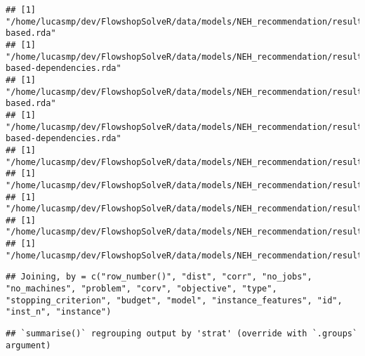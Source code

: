 \documentclass[
]{article}
\newenvironment{Shaded}{\begin{snugshade}}{\end{snugshade}}
\newcommand{\DataTypeTok}[1]{\textcolor[rgb]{0.13,0.29,0.53}{#1}}
\newcommand{\FloatTok}[1]{\textcolor[rgb]{0.00,0.00,0.81}{#1}}
\newcommand{\KeywordTok}[1]{\textcolor[rgb]{0.13,0.29,0.53}{\textbf{#1}}}
\newcommand{\NormalTok}[1]{#1}
\newcommand{\OperatorTok}[1]{\textcolor[rgb]{0.81,0.36,0.00}{\textbf{#1}}}
\newcommand{\StringTok}[1]{\textcolor[rgb]{0.31,0.60,0.02}{#1}}
\begin{document}
\begin{verbatim}
## [1] "/home/lucasmp/dev/FlowshopSolveR/data/models/NEH_recommendation/results/decision_tree,instance-based.rda"
## [1] "/home/lucasmp/dev/FlowshopSolveR/data/models/NEH_recommendation/results/decision_tree,instance-based-dependencies.rda"
## [1] "/home/lucasmp/dev/FlowshopSolveR/data/models/NEH_recommendation/results/rand_forest,instance-based.rda"
## [1] "/home/lucasmp/dev/FlowshopSolveR/data/models/NEH_recommendation/results/rand_forest,instance-based-dependencies.rda"
## [1] "/home/lucasmp/dev/FlowshopSolveR/data/models/NEH_recommendation/results/decision_tree,ablation.rda"
## [1] "/home/lucasmp/dev/FlowshopSolveR/data/models/NEH_recommendation/results/rand_forest,ablation.rda"
## [1] "/home/lucasmp/dev/FlowshopSolveR/data/models/NEH_recommendation/results/none,default.rda"
## [1] "/home/lucasmp/dev/FlowshopSolveR/data/models/NEH_recommendation/results/none,global_best.rda"
## [1] "/home/lucasmp/dev/FlowshopSolveR/data/models/NEH_recommendation/results/none,random.rda"
\end{verbatim}

\begin{verbatim}
## Joining, by = c("row_number()", "dist", "corr", "no_jobs", "no_machines", "problem", "corv", "objective", "type", "stopping_criterion", "budget", "model", "instance_features", "id", "inst_n", "instance")
\end{verbatim}

\begin{Shaded}
\end{Shaded}

\begin{verbatim}
## `summarise()` regrouping output by 'strat' (override with `.groups` argument)
\end{verbatim}
\end{document}
